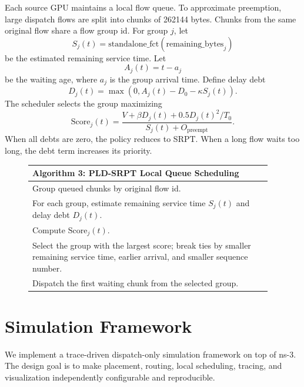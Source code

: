 \documentclass[10pt,conference]{IEEEtran}
\begin{document}
Each source GPU maintains a local flow queue. To approximate preemption, large dispatch flows are split into chunks of 262144 bytes. Chunks from the same original flow share a flow group id. For group $j$, let
\begin{equation}
S_j(t) = \mathrm{standalone\_fct}(\mathrm{remaining\_bytes}_j)
\end{equation}
be the estimated remaining service time. Let
\begin{equation}
A_j(t) = t - a_j
\end{equation}
be the waiting age, where $a_j$ is the group arrival time. Define delay debt
\begin{equation}
D_j(t)=\max(0,A_j(t)-D_0-\kappa S_j(t)).
\end{equation}
The scheduler selects the group maximizing
\begin{equation}
\mathrm{Score}_j(t)=
\frac{V+\beta D_j(t)+0.5D_j(t)^2/T_0}
{S_j(t)+O_{\mathrm{preempt}}}.
\end{equation}
When all debts are zero, the policy reduces to SRPT. When a long flow waits too long, the debt term increases its priority.

\begin{figure}[t]
\small
\begin{tabular}{p{0.96\linewidth}}
\toprule
\textbf{Algorithm 3: PLD-SRPT Local Queue Scheduling}\\
\midrule
Group queued chunks by original flow id.\\
For each group, estimate remaining service time $S_j(t)$ and delay debt $D_j(t)$.\\
Compute $\mathrm{Score}_j(t)$.\\
Select the group with the largest score; break ties by smaller remaining service time, earlier arrival, and smaller sequence number.\\
Dispatch the first waiting chunk from the selected group.\\
\bottomrule
\end{tabular}
\end{figure}

\section{Simulation Framework}

We implement a trace-driven dispatch-only simulation framework on top of ns-3. The design goal is to make placement, routing, local scheduling, tracing, and visualization independently configurable and reproducible.
\end{document}
